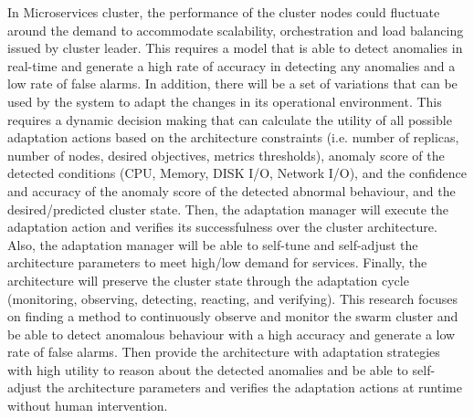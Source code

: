 \documentclass[sigconf]{acmart}
\begin{document}
In Microservices cluster, the performance of the cluster nodes could fluctuate around the demand to accommodate scalability, orchestration and load balancing issued by cluster leader. This requires a model that is able to detect anomalies in real-time and generate a high rate of accuracy in detecting any anomalies and a low rate of false alarms. In addition, there will be a set of variations that can be used by the system to adapt the changes in its operational environment. This requires a dynamic decision making that can calculate the utility of all possible adaptation actions based on the architecture constraints (i.e. number of replicas, number of nodes, desired objectives, metrics thresholds), anomaly score of the detected conditions (CPU, Memory, DISK I/O, Network I/O), and the confidence and accuracy of the anomaly score of the detected abnormal behaviour, and the desired/predicted cluster state. Then, the adaptation manager will execute the adaptation action and verifies its successfulness over the cluster architecture. Also, the adaptation manager will be able to self-tune and self-adjust the architecture parameters to meet high/low demand for services. Finally, the architecture will preserve the cluster state through the adaptation cycle (monitoring, observing, detecting, reacting, and verifying). This research focuses on finding a method to continuously observe and monitor the swarm cluster and be able to detect anomalous behaviour with a high accuracy and generate a low rate of false alarms. Then provide the architecture with adaptation strategies with high utility to reason about the detected anomalies and be able to self-adjust the architecture parameters and verifies the adaptation actions at runtime without human intervention.

  
\end{document}
